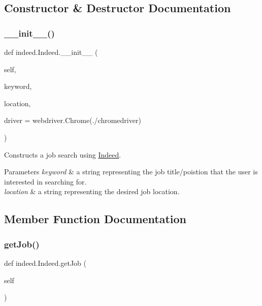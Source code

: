 \subsection{Constructor \& Destructor Documentation}
\mbox{\label{classindeed_1_1Indeed_a4bb7053b7c47c08884cf423ac5c27266}} 
\subsubsection{\texorpdfstring{\+\_\+\+\_\+init\+\_\+\+\_\+()}{\_\_init\_\_()}}
{\footnotesize\ttfamily def indeed.\+Indeed.\+\_\+\+\_\+init\+\_\+\+\_\+ (\begin{DoxyParamCaption}\item[{}]{self,  }\item[{}]{keyword,  }\item[{}]{location,  }\item[{}]{driver = {\ttfamily webdriver.Chrome(\textquotesingle{}./chromedriver\textquotesingle{})} }\end{DoxyParamCaption})}



Constructs a job search using \hyperlink{classindeed_1_1Indeed}{Indeed}. 


\begin{DoxyParams}{Parameters}
{\em keyword} & a string representing the job title/poistion that the user is interested in searching for. \\
\hline
{\em location} & a string representing the desired job location. \\
\hline
\end{DoxyParams}


\subsection{Member Function Documentation}
\mbox{\label{classindeed_1_1Indeed_a52d569fcd959a29e5a75a6f5fa2a9e4c}} 
\subsubsection{\texorpdfstring{get\+Job()}{getJob()}}
{\footnotesize\ttfamily def indeed.\+Indeed.\+get\+Job (\begin{DoxyParamCaption}\item[{}]{self }\end{DoxyParamCaption})}



